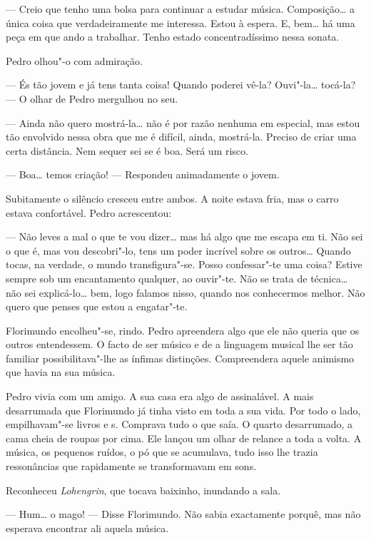 --- Creio que tenho uma bolsa para continuar a estudar música.
Composição\ldots{} a única coisa que verdadeiramente me interessa. Estou à
espera. E, bem\ldots{} há uma peça em que ando a trabalhar. Tenho estado
concentradíssimo nessa sonata.

Pedro olhou"-o com admiração.

--- És tão jovem e já tens tanta coisa! Quando poderei vê-la?
Ouvi"-la\ldots{} tocá-la? --- O olhar de Pedro mergulhou no seu.

--- Ainda não quero mostrá-la\ldots{} não é por razão nenhuma em especial, mas
estou tão envolvido nessa obra que me é difícil, ainda, mostrá-la.
Preciso de criar uma certa distância. Nem sequer sei se é boa. Será um
risco.

--- Boa\ldots{} temos criação! --- Respondeu animadamente o jovem.

Subitamente o silêncio cresceu entre ambos. A noite estava fria, mas o
carro estava confortável. Pedro acrescentou:

--- Não leves a mal o que te vou dizer\ldots{} mas há algo que me escapa em ti.
Não sei o que é, mas vou descobri"-lo, tens um poder incrível sobre os
outros\ldots{} Quando tocas, na verdade, o mundo transfigura"-se. Posso
confessar"-te uma coisa? Estive sempre sob um encantamento qualquer, ao
ouvir"-te. Não se trata de técnica\ldots{} não sei explicá-lo\ldots{} bem, logo
falamos nisso, quando nos conhecermos melhor. Não quero que penses que
estou a engatar"-te.

Florimundo encolheu"-se, rindo. Pedro apreendera algo que ele não queria
que os outros entendessem. O facto de ser músico e de a linguagem
musical lhe ser tão familiar possibilitava"-lhe as ínfimas distinções.
Compreendera aquele animismo que havia na sua música.

Pedro vivia com um amigo. A sua casa era algo de assinalável. A mais
desarrumada que Florimundo já tinha visto em toda a sua vida. Por todo o
lado, empilhavam"-se livros e s. Comprava tudo o que saía. O quarto
desarrumado, a cama cheia de roupas por cima. Ele lançou um olhar de
relance a toda a volta. A música, os pequenos ruídos, o pó que se
acumulava, tudo isso lhe trazia ressonâncias que rapidamente se
transformavam em sons.

Reconheceu \emph{Lohengrin}, que tocava baixinho, inundando a sala.

--- Hum\ldots{} o mago! --- Disse Florimundo. Não sabia exactamente porquê, mas
não esperava encontrar ali aquela música.

